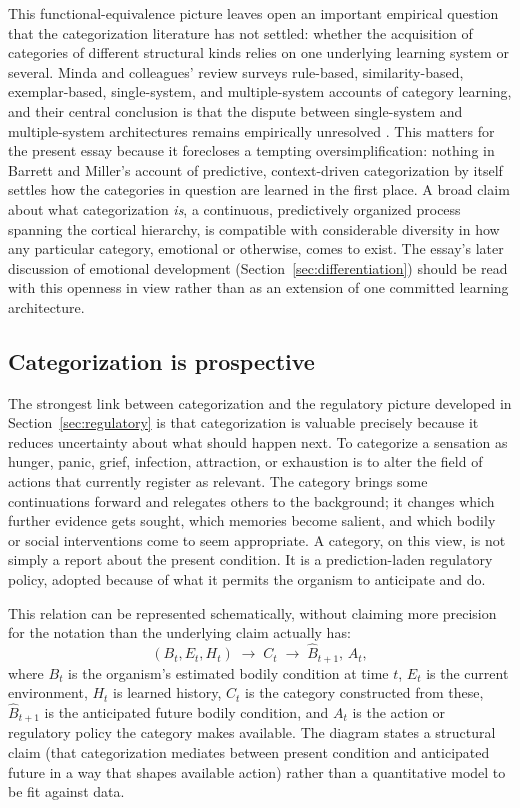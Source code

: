 \documentclass[11pt]{article}
\begin{document}
This functional-equivalence picture leaves open an important empirical question that the categorization literature has not settled: whether the acquisition of categories of different structural kinds relies on one underlying learning system or several. Minda and colleagues' review surveys rule-based, similarity-based, exemplar-based, single-system, and multiple-system accounts of category learning, and their central conclusion is that the dispute between single-system and multiple-system architectures remains empirically unresolved \citep{Minda2024}. This matters for the present essay because it forecloses a tempting oversimplification: nothing in Barrett and Miller's account of predictive, context-driven categorization by itself settles how the categories in question are learned in the first place. A broad claim about what categorization \emph{is}, a continuous, predictively organized process spanning the cortical hierarchy, is compatible with considerable diversity in how any particular category, emotional or otherwise, comes to exist. The essay's later discussion of emotional development (Section~\ref{sec:differentiation}) should be read with this openness in view rather than as an extension of one committed learning architecture.

\subsection{Categorization is prospective}

The strongest link between categorization and the regulatory picture developed in Section~\ref{sec:regulatory} is that categorization is valuable precisely because it reduces uncertainty about what should happen next. To categorize a sensation as hunger, panic, grief, infection, attraction, or exhaustion is to alter the field of actions that currently register as relevant. The category brings some continuations forward and relegates others to the background; it changes which further evidence gets sought, which memories become salient, and which bodily or social interventions come to seem appropriate. A category, on this view, is not simply a report about the present condition. It is a prediction-laden regulatory policy, adopted because of what it permits the organism to anticipate and do.

This relation can be represented schematically, without claiming more precision for the notation than the underlying claim actually has:
\[
(B_t, E_t, H_t) \;\longrightarrow\; C_t \;\longrightarrow\; \widehat{B}_{t+1},\, A_t,
\]
where $B_t$ is the organism's estimated bodily condition at time $t$, $E_t$ is the current environment, $H_t$ is learned history, $C_t$ is the category constructed from these, $\widehat{B}_{t+1}$ is the anticipated future bodily condition, and $A_t$ is the action or regulatory policy the category makes available. The diagram states a structural claim (that categorization mediates between present condition and anticipated future in a way that shapes available action) rather than a quantitative model to be fit against data.
\end{document}
